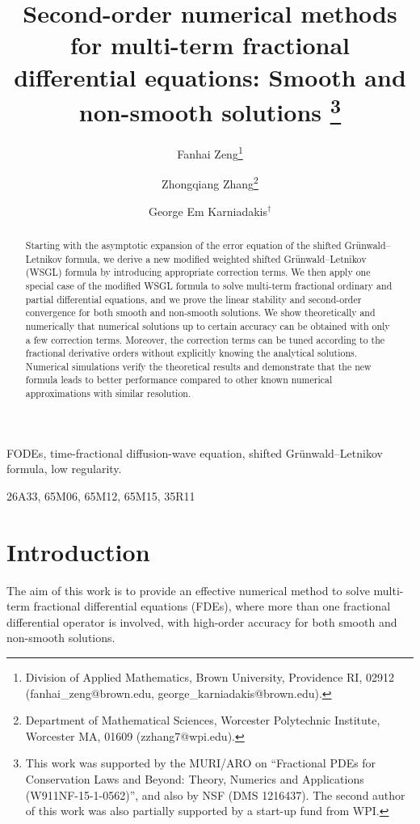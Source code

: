 \documentclass[10pt]{siamltex}
\title{Second-order numerical methods  for multi-term  fractional
differential equations: Smooth and non-smooth solutions
\thanks{This work was supported by the MURI/ARO on ``Fractional PDEs for Conservation Laws and Beyond: Theory, Numerics and  Applications  (W911NF-15-1-0562)'',  and  also  by  NSF (DMS  1216437). The second author of this work was also partially supported by a
start-up fund from WPI.}
}
\author{Fanhai Zeng\thanks{Division of Applied Mathematics, Brown University, Providence RI, 02912
(fanhai\_zeng@brown.edu, george\_karniadakis@brown.edu).}
\and Zhongqiang Zhang\thanks{Department of Mathematical Sciences, Worcester Polytechnic Institute, Worcester  MA, 01609 (zzhang7@wpi.edu).}
 \and George Em Karniadakis$^\dag$
}
\begin{document}
\maketitle

\begin{abstract}
Starting with the asymptotic expansion of the error equation
of the shifted Gr\"{u}nwald--Letnikov formula,
we derive a new modified weighted shifted Gr\"{u}nwald--Letnikov (WSGL) formula by introducing appropriate correction terms.
We then apply one special case of the modified WSGL formula to solve multi-term fractional
ordinary and partial differential equations, and we prove the linear stability and
second-order convergence for both smooth and non-smooth solutions.
We show theoretically and numerically that
numerical solutions up to certain accuracy can be obtained with only a few correction terms.
Moreover, the correction terms can be tuned according to the fractional derivative orders without explicitly knowing
the analytical solutions.
Numerical simulations verify the theoretical results and demonstrate that the new
formula leads to better performance
compared to other known numerical approximations with similar resolution.
\end{abstract}

\begin{keywords}
FODEs, time-fractional diffusion-wave equation,
shifted Gr\"{u}nwald--Letnikov formula,
low regularity.
\end{keywords}

\begin{AMS}
26A33, 65M06, 65M12, 65M15, 35R11
\end{AMS}


\section{Introduction}\label{sec1}
The aim of this work is to provide an effective numerical method to solve
multi-term  fractional differential equations (FDEs),
where more than one  fractional differential operator is involved,
with high-order accuracy  for both smooth and non-smooth solutions.
\end{document}
